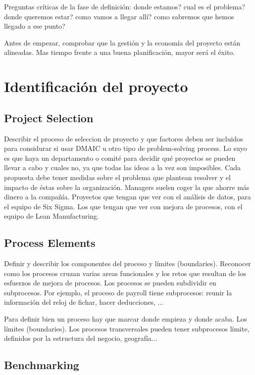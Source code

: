 \documentclass[]{article}
\begin{document}
Preguntas críticas de la fase de definición: donde estamos? cual es el problema? donde queremos estar? como vamos a llegar allí? como sabremos que hemos llegado a ese punto?

Antes de empezar, comprobar que la gestión y la economía del proyecto están alineadas. Mas tiempo frente a una buena planificación, mayor será el éxito. 

\section{Identificación del proyecto}
\subsection{Project Selection}

Describir el proceso de seleccion de proyecto y que factores deben ser incluidos para considurar si usar DMAIC u otro tipo de problem-solving process. Lo suyo es que haya un departamento o comité para decidir qué proyectos se pueden llevar a cabo y cuales no, ya que todas las ideas a la vez son imposibles. Cada propuesta debe tener medidas sobre el problema que plantean resolver y el impacto de éstas sobre la organización. Managers suelen coger la que ahorre más dinero a la compañía.
Proyectos que tengan que ver con el análisis de datos, para el equipo de Six Sigma. Los que tengan que ver con mejora de procesos, con el equipo de Lean Manufacturing.

\subsection{Process Elements}

Definir y describir los componentes del proceso	y límites (boundaries). Reconocer como los procesos cruzan varias areas funcionales y los retos que resultan de los esfuerzos de mejora de procesos. Los procesos se pueden subdividir en subprocesos.
Por ejemplo, el proceso de payroll tiene subprocesos: reunir la información del reloj de fichar, hacer deducciones, ...

Para definir bien un proceso hay que marcar donde empieza y donde acaba. Los límites (boundaries). Los procesos transversales pueden tener subprocesos límite, definidos por la estructura del negocio, geografía...

\subsection{Benchmarking}
\end{document}
